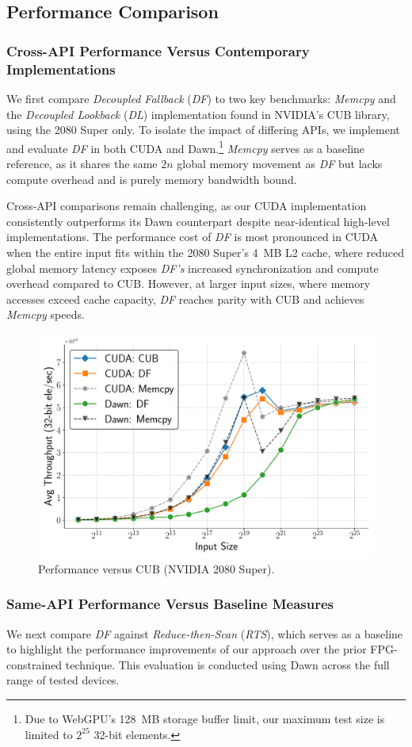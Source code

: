 \documentclass[acmsmall, manuscript, screen, review, anonymous]{acmart}
\begin{document}
\subsection{Performance Comparison}
\subsubsection{Cross-API Performance Versus Contemporary Implementations}
We first compare \emph{Decoupled Fallback} (\emph{DF}) to two key benchmarks: \emph{Memcpy} and the \emph{Decoupled Lookback} (\emph{DL}) implementation found in NVIDIA's CUB library, using the 2080 Super only. To isolate the impact of differing APIs, we implement and evaluate \emph{DF} in both CUDA and Dawn.\footnote{Due to WebGPU's 128~MB storage buffer limit, our maximum test size is limited to $2^{25}$ 32-bit elements.} \emph{Memcpy} serves as a baseline reference, as it shares the same $2n$ global memory movement as \emph{DF} but lacks compute overhead and is purely memory bandwidth bound.

Cross-API comparisons remain challenging, as our CUDA implementation consistently outperforms its Dawn counterpart despite near-identical high-level implementations. The performance cost of \emph{DF} is most pronounced in CUDA when the entire input fits within the 2080 Super's 4~MB L2 cache, where reduced global memory latency exposes \emph{DF's} increased synchronization and compute overhead compared to CUB\@. However, at larger input sizes, where memory accesses exceed cache capacity, \emph{DF} reaches parity with CUB and achieves \emph{Memcpy} speeds.

\begin{figure}
  \centering
  \includegraphics[width=0.6\linewidth]{graphics/cuda_plot.pdf}
  \caption{Performance versus CUB (NVIDIA 2080 Super).}
\end{figure}

\subsubsection{Same-API Performance Versus Baseline Measures}
We next compare \emph{DF} against \emph{Reduce-then-Scan} (\emph{RTS}), which serves as a baseline to highlight the performance improvements of our approach over the prior FPG-constrained technique. This evaluation is conducted using Dawn across the full range of tested devices.
\end{document}
